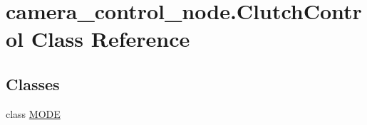 \hypertarget{classcamera__control__node_1_1ClutchControl}{\section{camera\-\_\-control\-\_\-node.\-Clutch\-Control Class Reference}
\label{classcamera__control__node_1_1ClutchControl}
}
\subsection*{Classes}
\begin{DoxyCompactItemize}
\item 
class \hyperlink{classcamera__control__node_1_1ClutchControl_1_1MODE}{M\-O\-D\-E}
\end{DoxyCompactItemize}
